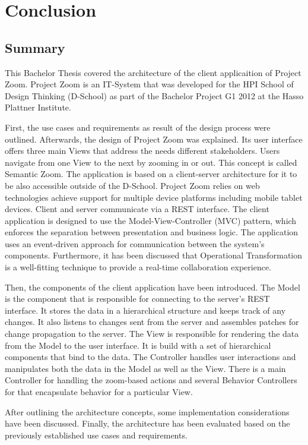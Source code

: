\chapter{Conclusion}

\section{Summary}
This Bachelor Thesis covered the architecture of the client applicaition of Project Zoom. Project Zoom is an IT-System that was developed for the HPI School of Design Thinking (D-School) as part of the Bachelor Project G1 2012 at the Hasso Plattner Institute.

First, the use cases and requirements as result of the design process were outlined. Afterwards, the design of Project Zoom was explained. Its user interface offers three main Views that address the needs different stakeholders. Users navigate from one View to the next by zooming in or out. This concept is called Semantic Zoom. The application is based on a client-server architecture for it to be also accessible outside of the D-School. Project Zoom relies on web technologies achieve support for multiple device platforms including mobile tablet devices. Client and server communicate via a REST interface. The client application is designed to use the Model-View-Controller (MVC) pattern, which enforces the separation between presentation and business logic. The application uses an event-driven approach for communication between the system's components. Furthermore, it has been discussed that Operational Transformation is a well-fitting technique to provide a real-time collaboration experience. 

Then, the components of the client application have been introduced. The Model is the component that is responsible for connecting to the server's REST interface. It stores the data in a hierarchical structure and keeps track of any changes. It also listens to changes sent from the server and assembles patches for change propagation to the server. The View is responsible for rendering the data from the Model to the user interface. It is build with a set of hierarchical components that bind to the data. The Controller handles user interactions and manipulates both the data in the Model as well as the View. There is a main Controller for handling the zoom-based actions and several Behavior Controllers for that encapsulate behavior for a particular View. 

After outlining the architecture concepts, some implementation considerations have been discussed. Finally, the architecture has been evaluated based on the previously established use cases and requirements.

